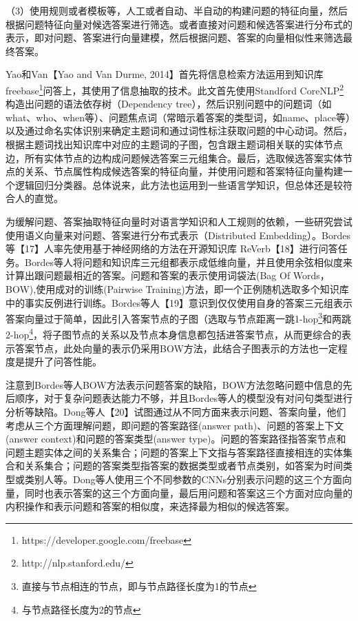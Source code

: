 （3）使用规则或者模板等，人工或者自动、半自动的构建问题的特征向量，然后根据问题特征向量对候选答案进行筛选。或者直接对问题和候选答案进行分布式的表示，即对问题、答案进行向量建模，然后根据问题、答案的向量相似性来筛选最终答案。

Yao和Van【Yao and Van Durme, 2014】首先将信息检索方法运用到知识库freebase\footnote{https://developer.google.com/freebase}问答上，其使用了信息抽取的技术。此文首先使用Standford CoreNLP\footnote{http://nlp.stanford.edu/}构造出问题的语法依存树（Dependency tree），然后识别问题中的问题词（如what、who、when等）、问题焦点词（常暗示着答案的类型词，如name、place等）以及通过命名实体识别来确定主题词和通过词性标注获取问题的中心动词。然后，根据主题词找出知识库中对应的主题词的子图，包含跟主题词相关联的实体节点边，所有实体节点的边构成问题候选答案三元组集合。最后，选取候选答案实体节点的关系、节点属性构成候选答案的特征向量，并使用问题和答案特征向量构建一个逻辑回归分类器。总体说来，此方法也运用到一些语言学知识，但总体还是较符合人的直觉。

为缓解问题、答案抽取特征向量时对语言学知识和人工规则的依赖，一些研究尝试使用语义向量来对问题、答案进行分布式表示（Distributed Embedding）。Bordes等【17】人率先使用基于神经网络的方法在开源知识库 ReVerb【18】进行问答任务。Bordes等人将问题和知识库三元组都表示成低维向量，并且使用余弦相似度来计算出跟问题最相近的答案。问题和答案的表示使用词袋法(Bag Of Words，BOW),使用成对的训练(Pairwise Training)方法，即一个正例随机选取多个知识库中的事实反例进行训练。Bordes等人【19】意识到仅仅使用自身的答案三元组表示答案向量过于简单，因此引入答案节点的子图（选取与节点距离一跳1-hop\footnote{直接与节点相连的节点，即与节点路径长度为1的节点}和两跳2-hop\footnote{与节点路径长度为2的节点}，将子图节点的关系以及节点本身信息都包括进答案节点，从而更综合的表示答案节点，此处向量的表示仍采用BOW方法，此结合子图表示的方法也一定程度是提升了问答性能。

注意到Bordes等人BOW方法表示问题答案的缺陷，BOW方法忽略问题中信息的先后顺序，对于复杂问题表达能力不够，并且Bordes等人的模型没有对问句类型进行分析等缺陷。Dong等人【20】试图通过从不同方面来表示问题、答案向量，他们考虑从三个方面理解问题，即问题的答案路径(answer path)、问题的答案上下文(answer context)和问题的答案类型(answer type)。问题的答案路径指答案节点和问题主题实体之间的关系集合；问题的答案上下文指与答案路径直接相连的实体集合和关系集合；问题的答案类型指答案的数据类型或者节点类别，如答案为时间类型或类别人等。Dong等人使用三个不同参数的CNNs分别表示问题的这三个方面向量，同时也表示答案的这三个方面向量，最后用问题和答案这三个方面对应向量的内积操作和表示问题和答案的相似度，来选择最为相似的候选答案。

